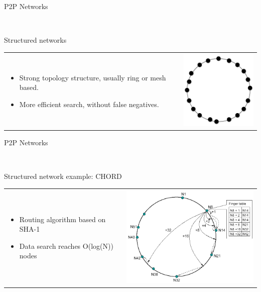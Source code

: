 \documentclass[12pt]{beamer}
\renewcommand{\frametitle}[1]{\vspace{0.2cm}\begin{huge}#1\end{huge}}
\renewcommand{\framesubtitle}[1]{\\ \vspace{0.4cm} \hspace{0.4cm}\begin{large}#1\end{large}}
\begin{document}
    \begin{frame}
    \frametitle{P2P Networks}
    \framesubtitle{Structured networks}
    \begin{table}
    \begin{tabular}{p{7cm}p{3cm}}
    \begin{itemize}
        \item Strong topology structure, usually ring or mesh based.
        \item More efficient search, without false negatives.
    \end{itemize}
    &
    \vspace{1.5cm}
    \includegraphics[width=4cm]{../../presentacion/img/p2p-structured}\\
    \end{tabular}
    \end{table}
    \end{frame}

    \begin{frame}
    \frametitle{P2P Networks}
    \framesubtitle{Structured network example: CHORD}
    \begin{table}
    \begin{tabular}{p{3cm}p{7cm}}
    \begin{itemize}
        \item Routing algorithm based on SHA-1
        \item Data search reaches O(log(N)) nodes
    \end{itemize}
    &
    \vspace{0.5cm}
    \includegraphics[width=8cm]{../../presentacion/img/chord-search}\\
    \end{tabular}
    \end{table}
    \end{frame}
\end{document}
